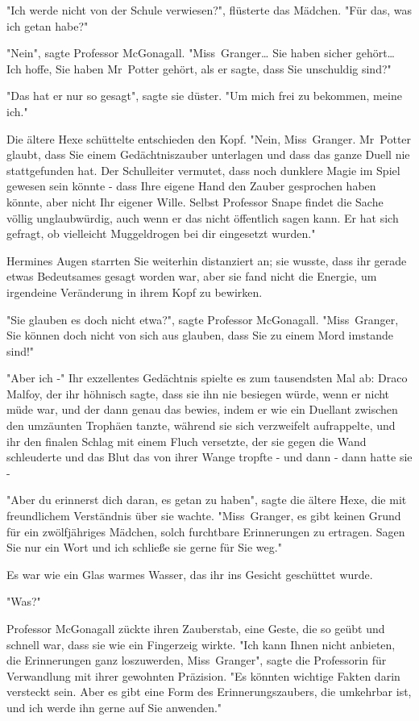 {"Ich werde nicht von der Schule verwiesen?", flüsterte das Mädchen. "Für das, was ich getan habe?"

"Nein", sagte Professor McGonagall. "Miss~Granger… Sie haben sicher gehört… Ich hoffe, Sie haben Mr~Potter gehört, als er sagte, dass Sie unschuldig sind?"

"Das hat er nur so gesagt", sagte sie düster. "Um mich frei zu bekommen, meine ich."

Die ältere Hexe schüttelte entschieden den Kopf. "Nein, Miss~Granger. Mr~Potter glaubt, dass Sie einem Gedächtniszauber unterlagen und dass das ganze Duell nie stattgefunden hat. Der Schulleiter vermutet, dass noch dunklere Magie im Spiel gewesen sein könnte - dass Ihre eigene Hand den Zauber gesprochen haben könnte, aber nicht Ihr eigener Wille. Selbst Professor Snape findet die Sache völlig unglaubwürdig, auch wenn er das nicht öffentlich sagen kann. Er hat sich gefragt, ob vielleicht Muggeldrogen bei dir eingesetzt wurden."

Hermines Augen starrten Sie weiterhin distanziert an; sie wusste, dass ihr gerade etwas Bedeutsames gesagt worden war, aber sie fand nicht die Energie, um irgendeine Veränderung in ihrem Kopf zu bewirken.

"Sie glauben es doch nicht etwa?", sagte Professor McGonagall. "Miss~Granger, Sie können doch nicht von sich aus glauben, dass Sie zu einem Mord imstande sind!"

"Aber ich -" Ihr exzellentes Gedächtnis spielte es zum tausendsten Mal ab: Draco Malfoy, der ihr höhnisch sagte, dass sie ihn nie besiegen würde, wenn er nicht müde war, und der dann genau das bewies, indem er wie ein Duellant zwischen den umzäunten Trophäen tanzte, während sie sich verzweifelt aufrappelte, und ihr den finalen Schlag mit einem Fluch versetzte, der sie gegen die Wand schleuderte und das Blut das von ihrer Wange tropfte - und dann - dann hatte sie -

"Aber du erinnerst dich daran, es getan zu haben", sagte die ältere Hexe, die mit freundlichem Verständnis über sie wachte. "Miss~Granger, es gibt keinen Grund für ein zwölfjähriges Mädchen, solch furchtbare Erinnerungen zu ertragen. Sagen Sie nur ein Wort und ich schließe sie gerne für Sie weg."

Es war wie ein Glas warmes Wasser, das ihr ins Gesicht geschüttet wurde.

"Was?"

Professor McGonagall zückte ihren Zauberstab, eine Geste, die so geübt und schnell war, dass sie wie ein Fingerzeig wirkte. "Ich kann Ihnen nicht anbieten, die Erinnerungen ganz loszuwerden, Miss~Granger", sagte die Professorin für Verwandlung mit ihrer gewohnten Präzision. "Es könnten wichtige Fakten darin versteckt sein. Aber es gibt eine Form des Erinnerungszaubers, die umkehrbar ist, und ich werde ihn gerne auf Sie anwenden."

}

